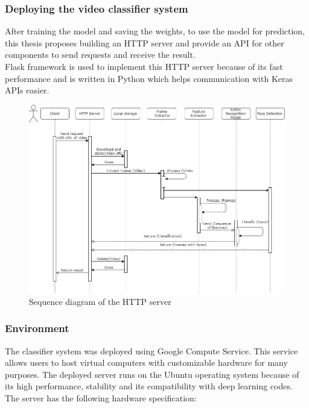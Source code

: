 \subsubsection{Deploying the video classifier system}
After training the model and saving the weights, to use the model for prediction, this thesis proposes building an HTTP server and provide an API for other components to send requests and receive the result. \\
Flask framework is used to implement this HTTP server because of its fast performance and is written in Python which helps communication with Keras APIs easier.
\begin{center}
    \begin{figure}[H]
    \centering
    \includegraphics[width=1\columnwidth]{images/chap4/server_sequence.png}
    \caption{Sequence diagram of the HTTP server}
    \end{figure}
\end{center}
\subsubsection{Environment}
The classifier system was deployed using Google Compute Service. This service allows users to host virtual computers with customizable hardware for many purposes. The deployed server runs on the Ubuntu operating system because of its high performance, stability and its compatibility with deep learning codes. The server has the following hardware specification:

